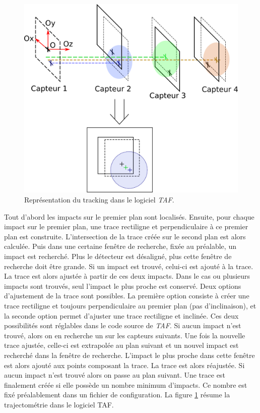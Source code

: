   \begin{figure}[!htb]
    \begin{center}
      \includegraphics[scale=1.0]{./figures/reconstruction_trace.png}
      \caption{Repr\'esentation du tracking dans le logiciel \textit{TAF}.}
      \label{fig:ref1}
    \end{center}
  \end{figure}   
  
   Tout d'abord les impacts sur le premier plan sont localis\'es. Ensuite, pour chaque impact sur le premier plan, une trace rectiligne et perpendiculaire \`a ce premier plan est construite. L'intersection de la trace cr\'e\'ee sur le second plan est alors calcul\'ee. Puis dans une certaine fenêtre de recherche, fix\'ee au pr\'ealable, un impact est recherch\'e. Plus le d\'etecteur est d\'esalign\'e, plus cette fenêtre de recherche doit être grande. Si un impact est trouv\'e, celui-ci est ajout\'e \`a la trace. La trace est alors ajust\'ee \`a partir de ces deux impacts. Dans le cas ou plusieurs impacts sont trouv\'es, seul l'impact le plus proche est conserv\'e. Deux options d'ajustement de la trace sont possibles. La premi\`ere option consiste \`a cr\'eer une trace rectiligne et toujours perpendiculaire au premier plan (pas d'inclinaison), et la seconde option permet d'ajuster une trace rectiligne et inclin\'ee. Ces deux possibilit\'es sont r\'eglables dans le code source de \textit{TAF}. Si aucun impact n'est trouv\'e, alors on en recherche un sur les capteurs suivants. Une fois la nouvelle trace ajust\'ee, celle-ci est extrapol\'ee au plan suivant et un nouvel impact est recherch\'e dans la fenêtre de recherche. L'impact le plus proche dans cette fen\^etre est alors ajout\'e aux points composant la trace. La trace est alors r\'eajust\'ee. Si aucun impact n'est trouv\'e alors on passe au plan suivant. Une trace est finalement cr\'e\'ee si elle poss\`ede un nombre minimum d'impacts. Ce nombre est fix\'e pr\'ealablement dans un fichier de configuration. La figure \ref{fig:ref1} r\'esume la trajectom\'etrie dans le logiciel TAF.
   

